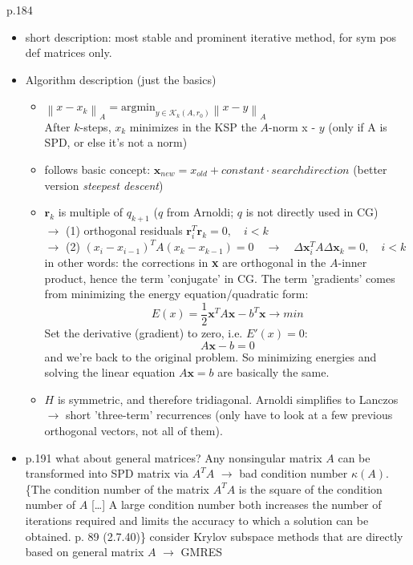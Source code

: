 \documentclass{scrartcl}
\numberwithin{equation}{section}
\newcommand{\norm}[1]{\left\lVert#1\right\rVert}
\begin{document}
\cite{Ascher:2011:FCN:2031413} p.184\\
\begin{itemize}
\item short description: most stable and prominent iterative method, for sym pos def matrices only.
\item Algorithm description (just the basics)
	\begin{itemize}
	\item $\norm{x - x_k}_A = \text{argmin}_{y \in \mathcal{K}_k(A, r_0)}\norm{x - y}_A$\\
	 After $k$-steps, $x_k$ minimizes in the KSP the $A$-norm x - $y$ (only if A is SPD, or else it's not a norm)
	\item follows basic concept: $\textbf{x}_{new} = x_{old} + constant \cdot search direction$ (better version \textit{steepest descent})
	\item $\textbf{r}_k$ is multiple of $q_{k+1}$ ($q$ from Arnoldi; $q$ is not directly used in CG)\\
	$\to$ (1) orthogonal residuals $\textbf{r}_i^T\textbf{r}_k = 0, \quad i < k$\\
	$\to$ (2) $(x_i - x_{i-1})^T A (x_k - x_{k-1}) = 0 \quad \to \quad\Delta \textbf{x}_i^T A \Delta \textbf{x}_k = 0, \quad  i < k$\\
	in other words: the corrections in \textbf{x} are orthogonal in the $A$-inner product, hence the term 'conjugate' in CG. The term 'gradients' comes from minimizing the energy equation/quadratic form:
	\begin{equation*}
	E(x) = \frac{1}{2} \textbf{x}^TA\textbf{x} - b^T\textbf{x} \to min
	\end{equation*}	 
	Set the derivative (gradient) to zero, i.e. $E'(x) = 0$:
	\begin{equation*}
	A\textbf{x} - b = 0
	\end{equation*}
	and we're back to the original problem. So minimizing energies and solving the linear equation $A\textbf{x} = b$ are basically the same.
	\item $H$ is symmetric, and therefore tridiagonal. Arnoldi simplifies to Lanczos $\to$ short 'three-term' recurrences (only have to look at a few previous orthogonal vectors, not all of them).
	\end{itemize}
\item p.191 what about general matrices? Any nonsingular matrix $A$ can be transformed into SPD matrix via $A^TA$ $\to$ bad condition number $\kappa (A)$.\\

\{The condition number of the matrix $A^TA$ is the square of the condition number of $A$ [\ldots] A large condition number both increases the number of iterations required and limits the accuracy to which a solution can be obtained. \cite{press92a} p. 89 (2.7.40)\}
consider Krylov subspace methods that are directly based on general matrix $A$ $\to$ GMRES
\end{itemize}
\end{document}
